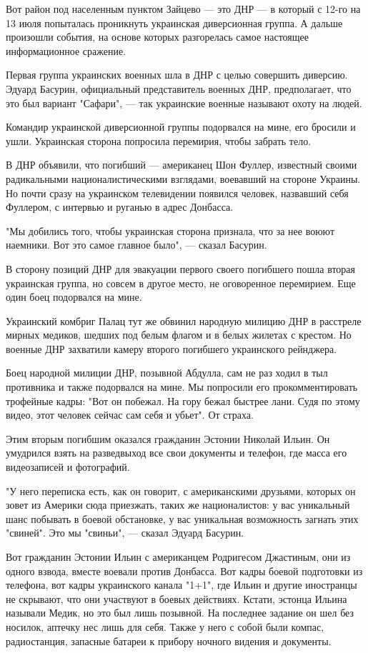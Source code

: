 \documentclass[a4paper,11pt]{extreport}
\begin{document}
Вот район под населенным пунктом Зайцево --- это ДНР --- в который с 12-го на 13
июля попыталась проникнуть украинская диверсионная группа. А дальше произошли
события, на основе которых разгорелась самое настоящее информационное сражение.

Первая группа украинских военных шла в ДНР с целью совершить диверсию. Эдуард
Басурин, официальный представитель военных ДНР, предполагает, что это был
вариант "Сафари", --- так украинские военные называют охоту на людей.

Командир украинской диверсионной группы подорвался на мине, его бросили и ушли.
Украинская сторона попросила перемирия, чтобы забрать тело.

В ДНР объявили, что погибший --- американец Шон Фуллер, известный своими
радикальными националистическими взглядами, воевавший на стороне Украины. Но
почти сразу на украинском телевидении появился человек, назвавший себя
Фуллером, с интервью и руганью в адрес Донбасса.

"Мы добились того, чтобы украинская сторона признала, что за нее воюют
наемники. Вот это самое главное было", --- сказал Басурин.

В сторону позиций ДНР для эвакуации первого своего погибшего пошла вторая
украинская группа, но совсем в другое место, не оговоренное перемирием. Еще
один боец подорвался на мине.

Украинский комбриг Палац тут же обвинил народную милицию ДНР в расстреле мирных
медиков, шедших под белым флагом и в белых жилетах с крестом. Но военные ДНР
захватили камеру второго погибшего украинского рейнджера.

Боец народной милиции ДНР, позывной Абдулла, сам не раз ходил в тыл противника
и также подорвался на мине. Мы попросили его прокомментировать трофейные кадры:
"Вот он побежал. На гору бежал быстрее лани. Судя по этому видео, этот человек
сейчас сам себя и убьет". От страха.

Этим вторым погибшим оказался гражданин Эстонии Николай Ильин. Он умудрился
взять на разведвыход все свои документы и телефон, где масса его видеозаписей и
фотографий.

"У него переписка есть, как он говорит, с американскими друзьями, которых он
зовет из Америки сюда приезжать, таких же националистов: у вас уникальный шанс
побывать в боевой обстановке, у вас уникальная возможность загнать этих
"свиней". Это мы "свиньи", --- сказал Эдуард Басурин.

Вот гражданин Эстонии Ильин с американцем Родригесом Джастиным, они из одного
взвода, вместе воевали против Донбасса. Вот кадры боевой подготовки из
телефона, вот кадры украинского канала "1+1", где Ильин и другие иностранцы не
скрывают, что они участвуют в боевых действиях. Кстати, эстонца Ильина называли
Медик, но это был лишь позывной. На последнее задание он шел без носилок,
аптечку нес лишь для себя. Также у него с собой были компас, радиостанция,
запасные батареи к прибору ночного видения и документы.
\end{document}

